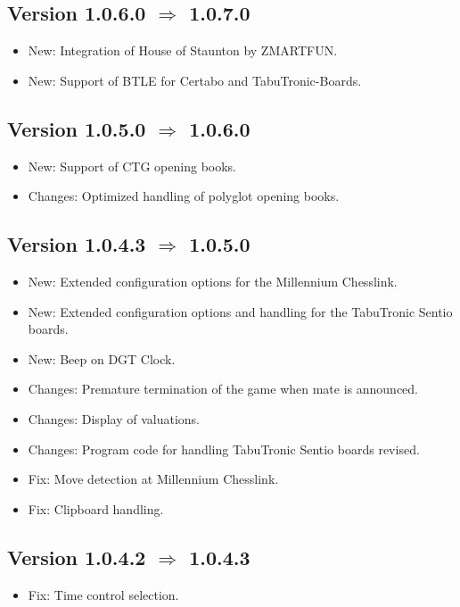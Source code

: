 \documentclass[11pt,a4paper]{article}
\begin{document}
\subsection*{Version 1.0.6.0 $\Rightarrow$  1.0.7.0}
\begin{itemize}			
	\item {\color{blue}New}: Integration of House of Staunton by ZMARTFUN.
	\item {\color{blue}New}: Support of BTLE for Certabo and TabuTronic-Boards.
\end{itemize}


\subsection*{Version 1.0.5.0 $\Rightarrow$  1.0.6.0}
\begin{itemize}			
	\item {\color{blue}New}: Support of CTG opening books.
	\item {\color{teal}Changes}: Optimized handling of polyglot opening books.
\end{itemize}

\subsection*{Version 1.0.4.3 $\Rightarrow$  1.0.5.0}
\begin{itemize}		
	\item {\color{blue}New}: Extended configuration options for the Millennium Chesslink.
	\item {\color{blue}New}: Extended configuration options and handling for the TabuTronic Sentio boards.
	\item {\color{blue}New}: Beep on DGT Clock.
	\item {\color{teal}Changes}: Premature termination of the game when mate is announced.
    \item {\color{teal}Changes}: Display of valuations.
    \item {\color{teal}Changes}: Program code for handling TabuTronic Sentio boards revised.
    \item {\color{red}Fix}: Move detection at Millennium Chesslink.
	\item {\color{red}Fix}: Clipboard handling.
\end{itemize}

\subsection*{Version 1.0.4.2 $\Rightarrow$  1.0.4.3}
\begin{itemize}		
	\item {\color{red}Fix}: Time control selection.
\end{itemize}
\end{document}
